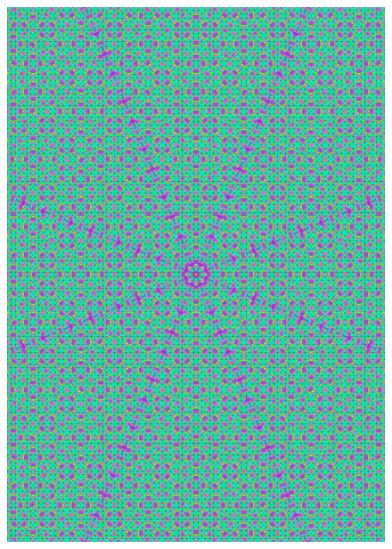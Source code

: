 \documentclass[text.tex]{subfiles}
\begin{document}
\begin{figure}[h!]
\centering
\includegraphics[width=1\textwidth]{img/results/octagon/quasi_polygon-octagon_241421_(0_1alpha_1).pdf}
\end{figure}

\clearpage
\restoregeometry
\end{document}

